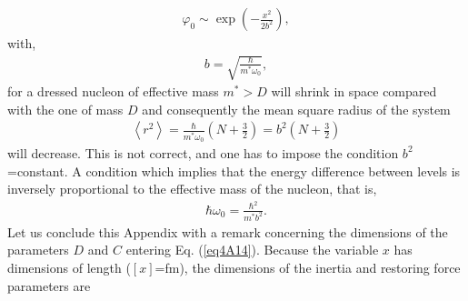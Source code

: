 \begin{align}\label{eq4A15}
\varphi_0\sim\exp\left(-\frac{x^2}{2b^2}\right),
\end{align}
with,
\begin{align}\label{eq4A16}
b=\sqrt{\frac{\hbar}{m^*\omega_0}},
\end{align}
for a dressed nucleon of effective mass $m^*>D$ will shrink in space compared with the one of mass $D$ and consequently the mean square radius of the system
\begin{align}\label{eq4A17}
\left\langle r^2\right\rangle=\frac{\hbar}{m^*\omega_0}\left(N+\frac{3}{2}\right)=b^2\left(N+\frac{3}{2}\right)
\end{align}
will decrease. This is not correct, and one has to impose the condition $b^2$=constant. A condition which implies that the energy difference between levels is inversely proportional to the effective mass of the nucleon, that is,
\begin{align}\label{eq4A18x}
\hbar\omega_0=\frac{\hbar^2}{m^*b^2}.
\end{align}
Let us conclude this Appendix with a remark concerning the dimensions of the parameters $D$ and $C$ entering Eq. (\ref{eq4A14}). Because the variable $x$ has dimensions of length ($[x]$=fm), the dimensions of the inertia and restoring force parameters are

